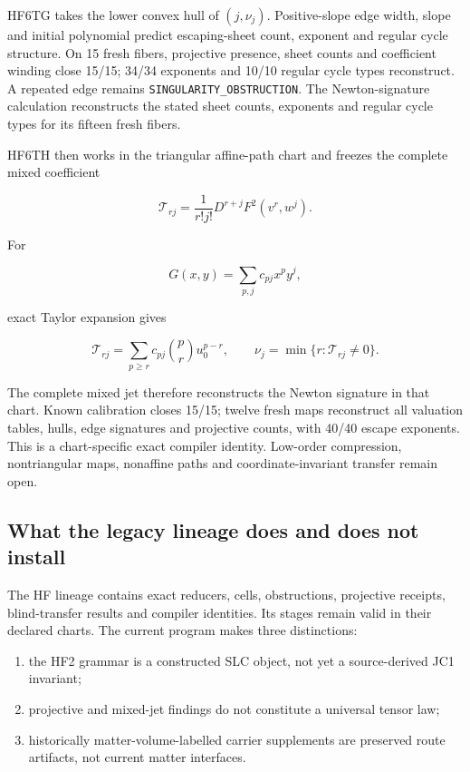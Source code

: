 HF6TG takes the lower convex hull of \((j,\nu_j)\). Positive-slope edge
width, slope and initial polynomial predict escaping-sheet count,
exponent and regular cycle structure. On 15 fresh fibers, projective
presence, sheet counts and coefficient winding close 15/15; 34/34
exponents and 10/10 regular cycle types reconstruct. A repeated edge
remains \texttt{SINGULARITY\_OBSTRUCTION}. The Newton-signature calculation reconstructs the stated sheet counts, exponents and regular cycle types for its fifteen fresh fibers.

HF6TH then works in the triangular affine-path chart and freezes the
complete mixed coefficient

\[
\mathcal T_{rj}
=\frac1{r!j!}D^{r+j}F^2(v^r,w^j).
\]

For

\[
G(x,y)=\sum_{p,j}c_{pj}x^py^j,
\]

exact Taylor expansion gives

\[
\mathcal T_{rj}
=\sum_{p\ge r}c_{pj}\binom pr u_0^{p-r},
\qquad
\nu_j=\min\{r:\mathcal T_{rj}\ne0\}.
\]

The complete mixed jet therefore reconstructs the Newton signature in
that chart. Known calibration closes 15/15; twelve fresh maps
reconstruct all valuation tables, hulls, edge signatures and projective
counts, with 40/40 escape exponents. This is a chart-specific exact
compiler identity. Low-order compression, nontriangular maps, nonaffine
paths and coordinate-invariant transfer remain open.

\subsection{What the legacy lineage does and does not
install}\label{viii-ch11-what-the-legacy-lineage-does-and-does-not-install}

The HF lineage contains exact reducers, cells, obstructions, projective
receipts, blind-transfer results and compiler identities. Its stages
remain valid in their declared charts. The current program makes three
distinctions:

\begin{enumerate}
\def\labelenumi{\arabic{enumi}.}
\tightlist
\item
  the HF2 grammar is a constructed SLC object, not yet a source-derived
  JC1 invariant;
\item
  projective and mixed-jet findings do not constitute a universal tensor
  law;
\item
  historically matter-volume-labelled carrier supplements are preserved
  route artifacts, not current matter interfaces.
\end{enumerate}

